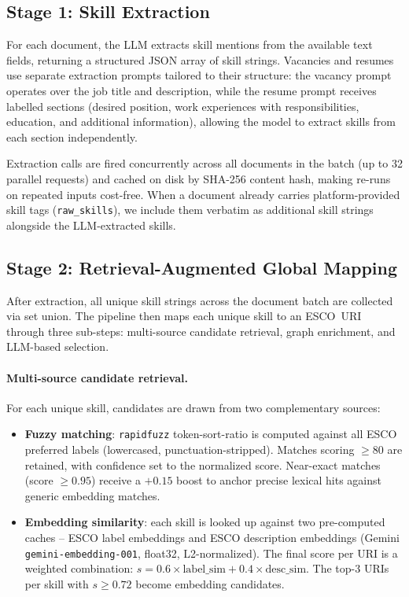 \documentclass[11pt]{article}
\begin{document}
\subsection{Stage 1: Skill Extraction}
\label{sec:stage1}

For each document, the LLM extracts skill mentions from the available text fields, returning a structured JSON array of skill strings. Vacancies and resumes use separate extraction prompts tailored to their structure: the vacancy prompt operates over the job title and description, while the resume prompt receives labelled sections (desired position, work experiences with responsibilities, education, and additional information), allowing the model to extract skills from each section independently.

Extraction calls are fired concurrently across all documents in the batch (up to 32 parallel requests) and cached on disk by SHA-256 content hash, making re-runs on repeated inputs cost-free. When a document already carries platform-provided skill tags (\texttt{raw\_skills}), we include them verbatim as additional skill strings alongside the LLM-extracted skills.

\subsection{Stage 2: Retrieval-Augmented Global Mapping}
\label{sec:stage2}

After extraction, all unique skill strings across the document batch are collected via set union. The pipeline then maps each unique skill to an ESCO~URI through three sub-steps: multi-source candidate retrieval, graph enrichment, and LLM-based selection.

\paragraph{Multi-source candidate retrieval.}
For each unique skill, candidates are drawn from two complementary sources:

\begin{itemize}
\setlength\itemsep{0.2em}
\item \textbf{Fuzzy matching}: \texttt{rapidfuzz} token-sort-ratio is computed against all ESCO preferred labels (lowercased, punctuation-stripped). Matches scoring $\geq 80$ are retained, with confidence set to the normalized score. Near-exact matches (score $\geq 0.95$) receive a $+0.15$ boost to anchor precise lexical hits against generic embedding matches.

\item \textbf{Embedding similarity}: each skill is looked up against two pre-computed caches -- ESCO label embeddings and ESCO description embeddings (Gemini \texttt{gemini-embedding-001}, float32, L2-normalized). The final score per URI is a weighted combination: $s = 0.6 \times \text{label\_sim} + 0.4 \times \text{desc\_sim}$. The top-3 URIs per skill with $s \geq 0.72$ become embedding candidates.
\end{itemize}
\end{document}
